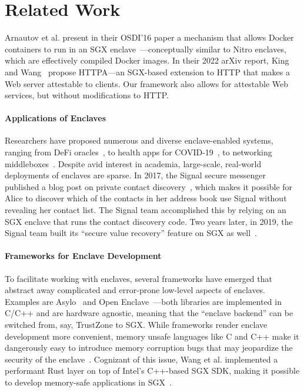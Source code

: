 \section{Related Work}
\label{sec:related-work}

Arnautov et al. present in their OSDI'16 paper a mechanism that allows Docker
containers to run in an SGX enclave~\cite{Arnautov2016a}---conceptually similar
to Nitro enclaves, which are effectively compiled Docker images.
%
In their 2022 arXiv report, King and Wang~\cite{King2022a} propose HTTPA---an
SGX-based extension to HTTP that makes a Web server attestable to clients.  Our
framework also allows for attestable Web services, but without modifications to
HTTP.

\paragraph{Applications of Enclaves}

Researchers have proposed numerous and diverse enclave-enabled systems, ranging
from DeFi oracles~\cite{Zhang16a}, to health apps for
COVID-19~\cite{Mailthody21a}, to networking middleboxes~\cite{Han17a}.  Despite
avid interest in academia, large-scale, real-world deployments of enclaves are
sparse.  In 2017, the Signal secure messenger published a blog post on private
contact discovery~\cite{Marlinspike17a}, which makes it possible for Alice to
discover which of the contacts in her address book use Signal without revealing
her contact list.  The Signal team accomplished this by relying on an SGX
enclave that runs the contact discovery code.  Two years later, in 2019, the
Signal team built its ``secure value recovery'' feature on SGX as
well~\cite{Lund19a}.

\paragraph{Frameworks for Enclave Development}

To facilitate working with enclaves, several frameworks have emerged that
abstract away complicated and error-prone low-level aspects of enclaves.
Examples are Asylo~\cite{asylo} and Open Enclave~\cite{openenclave}---both
libraries are implemented in C/C++ and are hardware agnostic, meaning that the
``enclave backend'' can be switched from, say, TrustZone to SGX.  While
frameworks render enclave development more convenient, memory unsafe languages
like C and C++ make it dangerously easy to introduce memory corruption bugs
that may jeopardize the security of the enclave~\cite{Lee2017a}.  Cognizant of
this issue, Wang et al. implemented a performant Rust layer on top of Intel's
C++-based SGX SDK, making it possible to develop memory-safe applications in
SGX~\cite{Wang2019a}.

